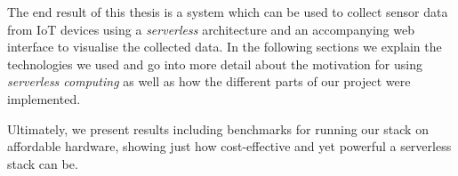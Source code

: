 The end result of this thesis is a system which can be used to collect sensor data from IoT devices
using a \textit{serverless} architecture and an accompanying web interface to visualise the
collected data. In the following sections we explain the technologies we used and go into more
detail about the motivation for using \textit{serverless computing} as well as how the different
parts of our project were implemented.

Ultimately, we present results including benchmarks for running our stack on affordable hardware,
showing just how cost-effective and yet powerful a serverless stack can be.
